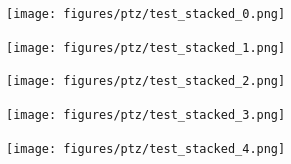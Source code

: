 \begin{appendices}
\begin{figure}
    \centering
    \texttt{[image: figures/ptz/test\_stacked\_0.png]}
\end{figure}
\begin{figure}
    \centering
    \texttt{[image: figures/ptz/test\_stacked\_1.png]}
\end{figure}
\begin{figure}
    \centering
    \texttt{[image: figures/ptz/test\_stacked\_2.png]}
\end{figure}
\begin{figure}
    \centering
    \texttt{[image: figures/ptz/test\_stacked\_3.png]}
\end{figure}
\begin{figure}
    \centering
    \texttt{[image: figures/ptz/test\_stacked\_4.png]}
\end{figure}

\end{appendices}